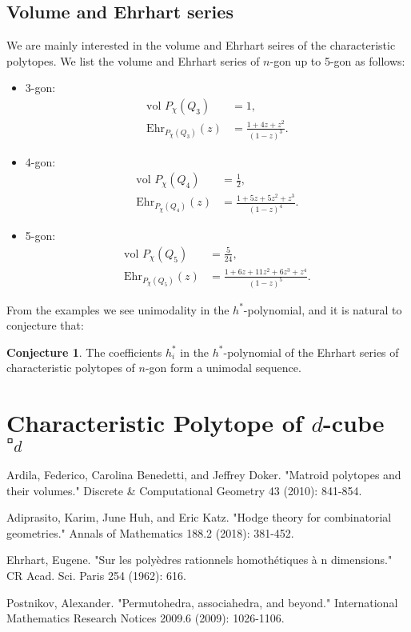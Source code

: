 \documentclass[12pt]{article}
\theoremstyle{definition}
\newtheorem{conj}[thm]{Conjecture}
\numberwithin{equation}{subsection}
\begin{document}
\subsection{Volume and Ehrhart series}
We are mainly interested in the volume and Ehrhart seires of the characteristic polytopes. 
We list the volume and Ehrhart series of $n$-gon up to 5-gon as follows:
\begin{itemize}
    \item 3-gon: 
    \begin{align*}
    \text{vol }P_{\chi}(Q_3) &= 1, \\
    \text{Ehr}_{P_{\chi}(Q_3)}(z) &= \frac{1 + 4z + z^2}{(1 - z)^3}.
    \end{align*}
    \item 4-gon: 
    \begin{align*}
    \text{vol }P_{\chi}(Q_4) &= \frac{1}{2}, \\
    \text{Ehr}_{P_{\chi}(Q_4)}(z) &= \frac{1 + 5z + 5z^2 + z^3}{(1 - z)^4}.
    \end{align*}
    \item 5-gon:
    \begin{align*}
    \text{vol }P_{\chi}(Q_5) &= \frac{5}{24}, \\
    \text{Ehr}_{P_{\chi}(Q_5)}(z) &= \frac{1 + 6z + 11z^2 + 6z^3 + z^4}{(1 - z)^5}.
    \end{align*}
\end{itemize}

From the examples we see unimodality in the $h^*$-polynomial, and it is natural to conjecture that:
\begin{conj}
    The coefficients $h^*_{i}$ in the $h^*$-polynomial of the Ehrhart series of characteristic polytopes of $n$-gon form a unimodal sequence.
\end{conj}

\section{Characteristic Polytope of $d$-cube $\square_{d}$}




\begin{thebibliography}{99}
 Ardila, Federico, Carolina Benedetti, and Jeffrey Doker. "Matroid polytopes and their volumes." Discrete \& Computational Geometry 43 (2010): 841-854.

 Adiprasito, Karim, June Huh, and Eric Katz. "Hodge theory for combinatorial geometries." Annals of Mathematics 188.2 (2018): 381-452.

 Ehrhart, Eugene. "Sur les polyèdres rationnels homothétiques à n dimensions." CR Acad. Sci. Paris 254 (1962): 616.

 Postnikov, Alexander. "Permutohedra, associahedra, and beyond." International Mathematics Research Notices 2009.6 (2009): 1026-1106.

\end{thebibliography}
\end{document}
